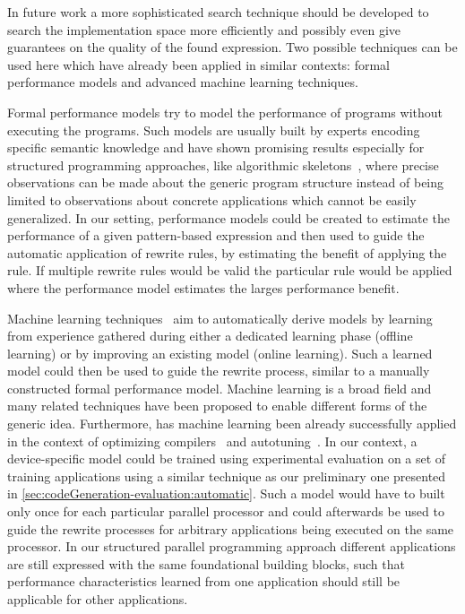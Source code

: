 In future work a more sophisticated search technique should be developed to search the implementation space more efficiently and possibly even give guarantees on the quality of the found expression.
Two possible techniques can be used here which have already been applied in similar contexts:
formal performance models and advanced machine learning techniques.

Formal performance models try to model the performance of programs without executing the programs.
Such models are usually built by experts encoding specific semantic knowledge and have shown promising results especially for structured programming approaches, like algorithmic skeletons~\cite{DarlingtonFHKSW93,Alt2007}, where precise observations can be made about the generic program structure instead of being limited to observations about concrete applications which cannot be easily generalized.
In our setting, performance models could be created to estimate the performance of a given pattern-based expression and then used to guide the automatic application of rewrite rules, by estimating the benefit of applying the rule.
If multiple rewrite rules would be valid the particular rule would be applied where the performance model estimates the larges performance benefit.

Machine learning techniques~\cite{Bishop2007} aim to automatically derive models by learning from experience gathered during either a dedicated learning phase (offline learning) or by improving an existing model (online learning).
Such a learned model could then be used to guide the rewrite process, similar to a manually constructed formal performance model.
Machine learning is a broad field and many related techniques have been proposed to enable different forms of the generic idea.
Furthermore, has machine learning been already successfully applied in the context of optimizing compilers~\cite{DubachJBFO09} and autotuning~\cite{CollinsFLC13}.
In our context, a device-specific model could be trained using experimental evaluation on a set of training applications using a similar technique as our preliminary one presented in \autoref{sec:codeGeneration-evaluation:automatic}.
Such a model would have to built only once for each particular parallel processor and could afterwards be used to guide the rewrite processes for arbitrary applications being executed on the same processor.
In our structured parallel programming approach different applications are still expressed with the same foundational building blocks, such that performance characteristics learned from one application should still be applicable for other applications.

